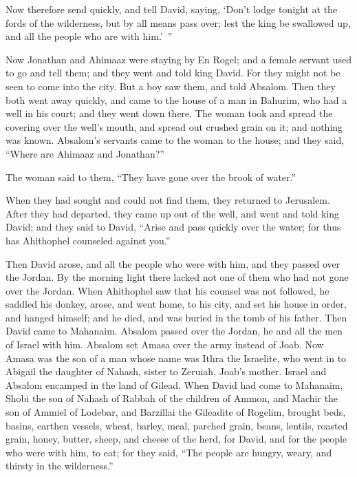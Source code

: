 {Now therefore send quickly, and tell David, saying, ‘Don’t lodge tonight at the fords of the wilderness, but by all means pass over; lest the king be swallowed up, and all the people who are with him.’ ”
\par }{\PP {}Now Jonathan and Ahimaaz were staying by En Rogel; and a female servant used to go and tell them; and they went and told king David. For they might not be seen to come into the city.
But a boy saw them, and told Absalom. Then they both went away quickly, and came to the house of a man in Bahurim, who had a well in his court; and they went down there.
The woman took and spread the covering over the well’s mouth, and spread out crushed grain on it; and nothing was known.
Absalom’s servants came to the woman to the house; and they said, “Where are Ahimaaz and Jonathan?”
\par }{\PP The woman said to them, “They have gone over the brook of water.”
\par }{\PP When they had sought and could not find them, they returned to Jerusalem.
After they had departed, they came up out of the well, and went and told king David; and they said to David, “Arise and pass quickly over the water; for thus has Ahithophel counseled against you.”
\par }{\PP {}Then David arose, and all the people who were with him, and they passed over the Jordan. By the morning light there lacked not one of them who had not gone over the Jordan.
When Ahithophel saw that his counsel was not followed, he saddled his donkey, arose, and went home, to his city, and set his house in order, and hanged himself; and he died, and was buried in the tomb of his father.
Then David came to Mahanaim. Absalom passed over the Jordan, he and all the men of Israel with him.
Absalom set Amasa over the army instead of Joab. Now Amasa was the son of a man whose name was Ithra the Israelite, who went in to Abigail the daughter of Nahash, sister to Zeruiah, Joab’s mother.
Israel and Absalom encamped in the land of Gilead.
When David had come to Mahanaim, Shobi the son of Nahash of Rabbah of the children of Ammon, and Machir the son of Ammiel of Lodebar, and Barzillai the Gileadite of Rogelim,
brought beds, basins, earthen vessels, wheat, barley, meal, parched grain, beans, lentils, roasted grain,
honey, butter, sheep, and cheese of the herd, for David, and for the people who were with him, to eat; for they said, “The people are hungry, weary, and thirsty in the wilderness.”

}
